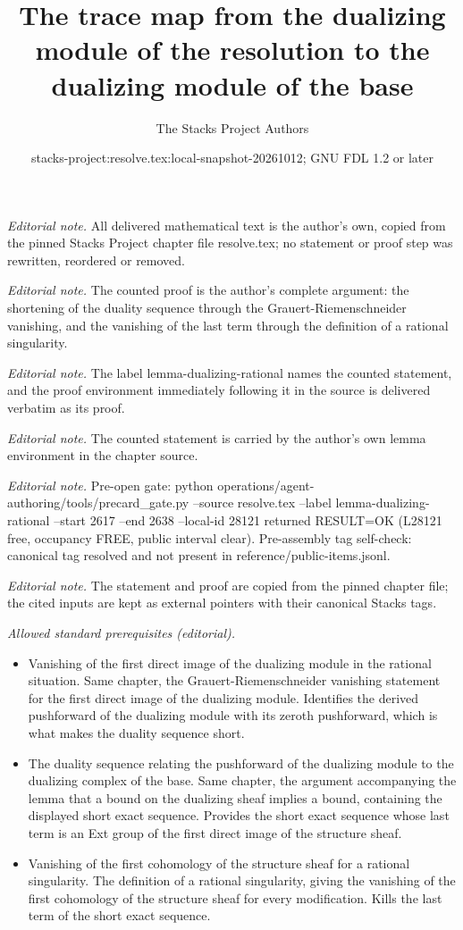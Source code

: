 \documentclass[10pt,a4paper]{amsart}
\title{The trace map from the dualizing module of the resolution to the dualizing module of the base}
\author{The Stacks Project Authors}
\date{stacks-project:resolve.tex:local-snapshot-20261012; GNU FDL 1.2 or later}
\theoremstyle{plain}
\theoremstyle{definition}
\theoremstyle{remark}
\numberwithin{equation}{subsection}
\begin{document}
\maketitle
\noindent\textit{Editorial note.} All delivered mathematical text is the author's own, copied from the pinned Stacks Project chapter file resolve.tex; no statement or proof step was rewritten, reordered or removed.\par\medskip
\noindent\textit{Editorial note.} The counted proof is the author's complete argument: the shortening of the duality sequence through the Grauert-Riemenschneider vanishing, and the vanishing of the last term through the definition of a rational singularity.\par\medskip
\noindent\textit{Editorial note.} The label lemma-dualizing-rational names the counted statement, and the proof environment immediately following it in the source is delivered verbatim as its proof.\par\medskip
\noindent\textit{Editorial note.} The counted statement is carried by the author's own lemma environment in the chapter source.\par\medskip
\noindent\textit{Editorial note.} Pre-open gate: python operations/agent-authoring/tools/precard\_gate.py --source resolve.tex --label lemma-dualizing-rational --start 2617 --end 2638 --local-id 28121 returned RESULT=OK (L28121 free, occupancy FREE, public interval clear). Pre-assembly tag self-check: canonical tag resolved and not present in reference/public-items.jsonl.\par\medskip
\noindent\textit{Editorial note.} The statement and proof are copied from the pinned chapter file; the cited inputs are kept as external pointers with their canonical Stacks tags.\par\medskip
\noindent\textit{Allowed standard prerequisites (editorial).}\begin{itemize}
\item Vanishing of the first direct image of the dualizing module in the rational situation. Same chapter, the Grauert-Riemenschneider vanishing statement for the first direct image of the dualizing module. Identifies the derived pushforward of the dualizing module with its zeroth pushforward, which is what makes the duality sequence short.
\item The duality sequence relating the pushforward of the dualizing module to the dualizing complex of the base. Same chapter, the argument accompanying the lemma that a bound on the dualizing sheaf implies a bound, containing the displayed short exact sequence. Provides the short exact sequence whose last term is an Ext group of the first direct image of the structure sheaf.
\item Vanishing of the first cohomology of the structure sheaf for a rational singularity. The definition of a rational singularity, giving the vanishing of the first cohomology of the structure sheaf for every modification. Kills the last term of the short exact sequence.
\end{itemize}\medskip
\end{document}
